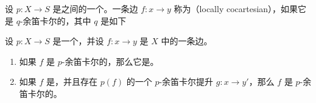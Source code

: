 \begin{definition}\label{def:locally-cocartesian}
设 $p\colon X \to S$ 是\trSimplicialSet{}之间的一个\trInnerFibration{}。一条边
$f\colon x \to y$ 称为\emph{\trLocallyCocartesian}（locally cocartesian），如果它是
$q$-余笛卡尔的，其中 $q$ 是如下\trPullback{}%
\begin{center}
\end{center}
\end{definition}

\begin{lemma}\label{lem:locally-cocartesian}
设 $p\colon X \to S$ 是一个\trInnerFibration{}，并设 $f\colon x \to y$ 是 $X$
中的一条边。
\begin{enumerate}[label=(\arabic*)]
  \item 如果 $f$ 是 $p$-余笛卡尔的，那么它是\trLocallyCocartesian。
  \item 如果 $f$ 是\trLocallyCocartesian，并且存在 $p(f)$ 的一个 $p$-余笛卡尔提升
        $g\colon x \to y'$，那么 $f$ 是 $p$-余笛卡尔的。
\end{enumerate}
\end{lemma}

